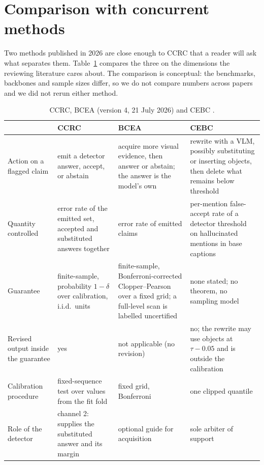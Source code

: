 \section{Comparison with concurrent methods}
\label{sec:concurrent}

Two methods published in 2026 are close enough to CCRC that a reader will ask what separates them.
Table~\ref{tab:concurrent} compares the three on the dimensions the reviewing literature cares about. The comparison
is conceptual: the benchmarks, backbones and sample sizes differ, so we do not compare numbers across papers and we
did not rerun either method.

\begin{table}[t]
\centering
\caption{CCRC, BCEA \citep{bcea} (version 4, 21 July 2026) and CEBC \citep{mishra2026cebc}.}
\label{tab:concurrent}
\footnotesize
\begin{tabular}{@{}p{}p{}p{}p{}@{}}
\toprule
 & CCRC & BCEA & CEBC\\
\midrule
Action on a flagged claim & emit a detector answer, accept, or abstain & acquire more visual evidence, then answer or abstain; the answer is the model's own & rewrite with a VLM, possibly substituting or inserting objects, then delete what remains below threshold\\
Quantity controlled & error rate of the emitted set, accepted and substituted answers together & error rate of emitted claims & per-mention false-accept rate of a detector threshold on hallucinated mentions in base captions\\
Guarantee & finite-sample, probability $1-\delta$ over calibration, i.i.d.\ units & finite-sample, Bonferroni-corrected Clopper--Pearson over a fixed grid; a full-level scan is labelled uncertified & none stated; no theorem, no sampling model\\
Revised output inside the guarantee & yes & not applicable (no revision) & no; the rewrite may use objects at $\tau-0.05$ and is outside the calibration\\
Calibration procedure & fixed-sequence test over values from the fit fold & fixed grid, Bonferroni & one clipped quantile\\
Role of the detector & channel 2: supplies the substituted answer and its margin & optional guide for acquisition & sole arbiter of support\\
\bottomrule
\end{tabular}
\end{table}

